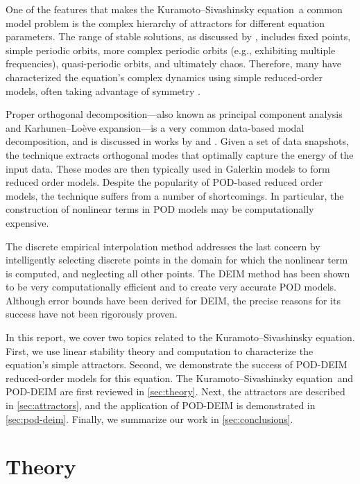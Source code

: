 \documentclass[11pt]{article}
\newcommand{\KSE}{Kuramoto--Sivashinsky equation}
\begin{document}
One of the features that makes the \KSE\ a common model problem is the complex hierarchy of attractors for different equation parameters.
The range of stable solutions, as discussed by \cite{KevrekidisSIAMJAM90}, includes fixed points, simple periodic orbits, more complex periodic orbits (e.g., exhibiting multiple frequencies), quasi-periodic orbits, and ultimately chaos.
Therefore, many have characterized the equation's complex dynamics using simple reduced-order models, often taking advantage of symmetry \citep[e.g.,][]{AubrySIAMJSC93, RowleyPD00}.

Proper orthogonal decomposition---also known as principal component analysis and Karhunen--Lo\`eve expansion---is a very common data-based modal decomposition, and is discussed in works by \cite{SirovichQAM87} and \cite{HolmesTCSDSS}.
Given a set of data snapshots, the technique extracts orthogonal modes that optimally capture the energy of the input data.
These modes are then typically used in Galerkin models to form reduced order models.
Despite the popularity of POD-based reduced order models, the technique suffers from a number of shortcomings.
In particular, the construction of nonlinear terms in POD models may be computationally expensive.

The discrete empirical interpolation method \citep[DEIM;][]{ChaturantabutIEEECDC09, ChaturantabutRice09a} addresses the last concern by intelligently selecting discrete points in the domain for which the nonlinear term is computed, and neglecting all other points.
The DEIM method has been shown to be very computationally efficient and to create very accurate POD models.
Although error bounds have been derived for DEIM, the precise reasons for its success have not been rigorously proven.

In this report, we cover two topics related to the \KSE.
First, we use linear stability theory and computation to characterize the equation's simple attractors.
Second, we demonstrate the success of POD-DEIM reduced-order models for this equation.
The \KSE\ and POD-DEIM are first reviewed in \autoref{sec:theory}.
Next, the attractors are described in \autoref{sec:attractors}, and the application of POD-DEIM is demonstrated in \autoref{sec:pod-deim}.
Finally, we summarize our work in \autoref{sec:conclusions}.

\section{Theory}
\label{sec:theory}
\end{document}
